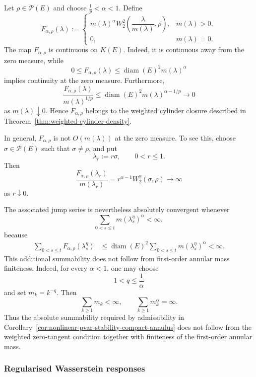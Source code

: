 \documentclass[a4paper,10pt]{article}
\begin{document}
Let
$
        \rho\in\mathcal P(E)
$
and choose
$
        \frac1p<\alpha<1.
$
Define
\[
F_{\alpha,\rho}(\lambda)
:=
\begin{cases}
m(\lambda)^\alpha
W_2^2\left(
        \dfrac{\lambda}{m(\lambda)},
        \rho
\right),
& m(\lambda)>0,\\[2mm]
0,
& m(\lambda)=0.
\end{cases}
\]
The map \(F_{\alpha,\rho}\) is continuous on \(K(E)\). Indeed, it is
continuous away from the zero measure, while
\[
        0
        \le
        F_{\alpha,\rho}(\lambda)
        \le
        \operatorname{diam}(E)^2m(\lambda)^\alpha
\]
implies continuity at the zero measure. Furthermore,
\[
\frac{
F_{\alpha,\rho}(\lambda)
}{
m(\lambda)^{1/p}
}
\le
\operatorname{diam}(E)^2
m(\lambda)^{\alpha-1/p}
\longrightarrow0
\]
as \(m(\lambda)\downarrow0\). Hence
\(F_{\alpha,\rho}\) belongs to the weighted cylinder closure described
in Theorem~\ref{thm:weighted-cylinder-density}.

In general, \(F_{\alpha,\rho}\) is not
\(O(m(\lambda))\) at the zero measure. To see this, choose
\(\sigma\in\mathcal P(E)\) such that \(\sigma\ne\rho\), and put
\[
        \lambda_r:=r\sigma,
        \qquad 0<r\le1.
\]
Then
\[
\frac{
F_{\alpha,\rho}(\lambda_r)
}{
m(\lambda_r)
}
=
r^{\alpha-1}W_2^2(\sigma,\rho)
\longrightarrow\infty
\]
as \(r\downarrow0\).

The associated jump series is nevertheless absolutely convergent
whenever
\[
        \sum_{0<s\le t}
        m(\lambda_s^\eta)^\alpha
        <
        \infty,
\]
because
\[
\begin{aligned}
\sum_{0<s\le t}
F_{\alpha,\rho}(\lambda_s^\eta)
&\le
\operatorname{diam}(E)^2
\sum_{0<s\le t}
m(\lambda_s^\eta)^\alpha
<
\infty.
\end{aligned}
\]
This additional summability does not follow from first-order annular
mass finiteness. Indeed, for every \(\alpha<1\), one may choose
\[
        1<q\le\frac1\alpha
\]
and set \(m_k=k^{-q}\). Then
\[
        \sum_{k\ge1}m_k<\infty,
        \qquad
        \sum_{k\ge1}m_k^\alpha=\infty.
\]
Thus the absolute summability required by admissibility in
Corollary~\ref{cor:nonlinear-pvar-stability-compact-annulus}
does not follow from the weighted zero-tangent condition together
with finiteness of the first-order annular mass.

\subsubsection{Regularised Wasserstein responses}
\end{document}
